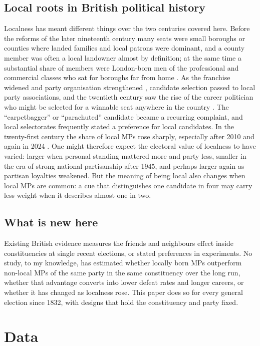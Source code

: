 \documentclass[11pt,a4paper]{article}
\begin{document}
\subsection{Local roots in British political history}
Localness has meant different things over the two centuries covered here. Before the reforms of the later nineteenth century many seats were small boroughs or counties where landed families and local patrons were dominant, and a county member was often a local landowner almost by definition; at the same time a substantial share of members were London-born men of the professional and commercial classes who sat for boroughs far from home \citep{hotham2026mpl}. As the franchise widened and party organisation strengthened \citep{cox1987}, candidate selection passed to local party associations, and the twentieth century saw the rise of the career politician who might be selected for a winnable seat anywhere in the country \citep{rush2001,norrislovenduski1995}. The ``carpetbagger'' or ``parachuted'' candidate became a recurring complaint, and local selectorates frequently stated a preference for local candidates. In the twenty-first century the share of local MPs rose sharply, especially after 2010 and again in 2024 \citep{hotham2026mpl}. One might therefore expect the electoral value of localness to have varied: larger when personal standing mattered more and party less, smaller in the era of strong national partisanship after 1945, and perhaps larger again as partisan loyalties weakened. But the meaning of being local also changes when local MPs are common: a cue that distinguishes one candidate in four may carry less weight when it describes almost one in two.

\subsection{What is new here}
Existing British evidence measures the friends and neighbours effect inside constituencies at single recent elections, or stated preferences in experiments. No study, to my knowledge, has estimated whether locally born MPs outperform non-local MPs of the same party in the same constituency over the long run, whether that advantage converts into lower defeat rates and longer careers, or whether it has changed as localness rose. This paper does so for every general election since 1832, with designs that hold the constituency and party fixed.

\section{Data}
\end{document}
